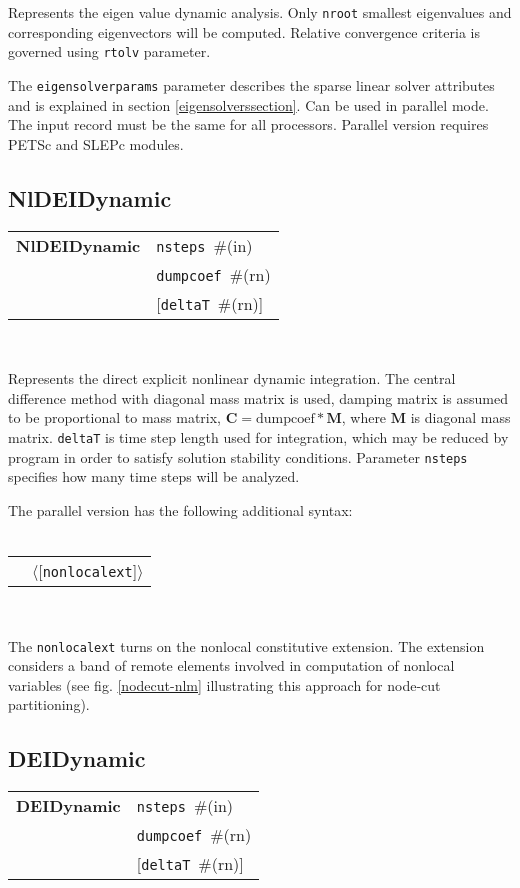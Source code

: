 \documentclass[a4paper]{article}
\makeatletter
\newcommand{\mbf}[1]{\boldsymbol{#1}}
\newcommand{\param}[1]{\texttt{#1}} %
\newcommand{\optional}[1]{[#1]} %
\newcommand{\field}[2]{\param{#1}~\#{\tiny(#2)}} %
\newcommand{\optField}[2]{\optional{\field{#1}{#2}}}
\newcommand{\optFieldnotype}[1]{[\param{#1}]}
\newcommand{\entKeywordInst}[1]{\textbf{#1}} %
\newcommand{\Pmode}[1]{{\sffamily #1}}
\newcommand{\oofemParallel}[1]{$\langle${#1}$\rangle$}
\newcommand{\PoptFieldnotype}[1]{\oofemParallel{\optFieldnotype{#1}}}
\newenvironment{record}[1][]{\begin{tabular}{|ll}}{\end{tabular}\\}
\newcommand{\recentry}[2]{{#1}&{#2}\\}
\newcounter{rcc}
\newenvironment{record}[1][\textwidth]{\setcounter{rcc}{0}\begin{tabular*}{#1}{|ll@{\extracolsep{\fill}}r}}{\end{tabular*}\\}
\newcommand{\recentry}[2]{\ifthenelse{\value{rcc}>0}{&$\backslash$ \\}{\setcounter{rcc}{1}}{#1}&{#2}}
\makeatother
\begin{document}
Represents the eigen value dynamic analysis.
Only \param{nroot} smallest eigenvalues and corresponding
eigenvectors will be computed. Relative convergence criteria is
governed using \param{rtolv} parameter.

The \param{eigensolverparams} parameter describes the sparse
linear solver attributes and is explained in section \ref{eigensolverssection}.
\Pmode{Can be used in parallel mode. The input record must be the same
for all processors. Parallel version requires PETSc and SLEPc modules.}


\subsection{NlDEIDynamic}
\label{NlDEIDynamic}
\begin{record}
  \recentry{\entKeywordInst{NlDEIDynamic}}{\field{nsteps}{in}}
  \recentry{}{\field{dumpcoef}{rn}}
  \recentry{}{\optField{deltaT}{rn}}
\end{record}

Represents the direct explicit  nonlinear dynamic  integration.
The central difference method with diagonal mass matrix is used,
damping matrix is assumed to be proportional to mass matrix, $\mbf{C}
= \mathrm{dumpcoef} * \mbf{M}$, where
$\mbf{M}$ is diagonal mass matrix. \param{deltaT} is time step length used for
integration, which may be reduced by program in order to satisfy
solution stability conditions. Parameter \param{nsteps} specifies
how many time steps will be analyzed.

The parallel version has the following additional syntax:\\ \\
\begin{record}
  \recentry{}{\PoptFieldnotype{nonlocalext}}
\end{record}

\noindent
\Pmode{
The \param{nonlocalext} turns on the nonlocal constitutive
extension. The extension considers a band of remote elements involved
in computation of nonlocal variables (see fig. \ref{nodecut-nlm} illustrating
this approach for node-cut partitioning).
}

\subsection{DEIDynamic}
\label{DEIDynamic}

\begin{record}
  \recentry{\entKeywordInst{DEIDynamic}}{\field{nsteps}{in}}
  \recentry{}{\field{dumpcoef}{rn}}
  \recentry{}{\optField{deltaT}{rn}}
\end{record}
\end{document}

